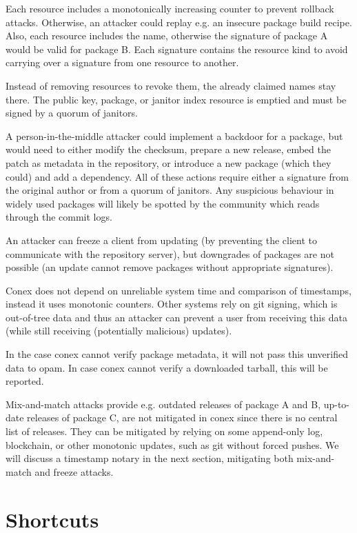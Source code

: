 \documentclass[nocopyrightspace]{sigplanconf}
\newcommand{\TODO}[1]{\textbf{[TODO: #1]}}
\begin{document}
Each resource includes a monotonically increasing counter to prevent rollback attacks.
Otherwise, an attacker could replay e.g. an insecure package build recipe.
Also, each resource includes the name, otherwise the signature of package A would be valid for package B.
Each signature contains the resource kind to avoid carrying over a signature from one resource to another.

Instead of removing resources to revoke them, the already claimed names stay there.
The public key, package, or janitor index resource is emptied and must be signed by a quorum of janitors.

A person-in-the-middle attacker could implement a backdoor for a package, but would need to either modify the checksum, prepare a new release, embed the patch as metadata in the repository, or introduce a new package (which they could) and add a dependency.
All of these actions require either a signature from the original author or from a quorum of janitors.
Any suspicious behaviour in widely used packages will likely be spotted by the community which reads through the commit logs.

An attacker can freeze a client from updating (by preventing the client to communicate with the repository server), but downgrades of packages are not possible (an update cannot remove packages without appropriate signatures).

Conex does not depend on unreliable system time and comparison of timestamps, instead it uses monotonic counters.
Other systems rely on git signing, which is out-of-tree data and thus an attacker can prevent a user from receiving this data (while still receiving (potentially malicious) updates).

In the case conex cannot verify package metadata, it will not pass this unverified data to opam.
In case conex cannot verify a downloaded tarball, this will be reported.

Mix-and-match attacks provide e.g. outdated releases of package A and B, up-to-date releases of package C, are not mitigated in conex since there is no central list of releases.
They can be mitigated by relying on some append-only log, blockchain, or other monotonic updates, such as git without forced pushes.
We will discuss a timestamp notary in the next section, mitigating both mix-and-match and freeze attacks.

\section{Shortcuts} \label{sec:shortcuts}
\end{document}
